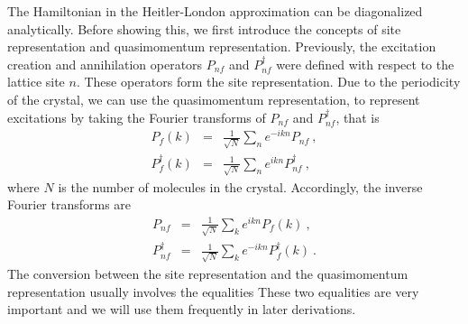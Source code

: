 The Hamiltonian in the Heitler-London approximation can be diagonalized analytically. Before showing this, we first introduce the concepts of site representation and quasimomentum representation. 
Previously,  the excitation creation and annihilation operators $P_{nf}$ and $P_{nf}^{\dagger}$ were defined with respect 
to the lattice site $n$. 
These operators form the site representation. Due to the periodicity of the crystal, we can use the quasimomentum representation, to represent excitations by taking the Fourier transforms of $P_{nf}$ and $P_{nf}^{\dagger}$, that is
\begin{eqnarray}
P_{f}(k)  &=& \frac{1}{\sqrt{N}} \sum_{n}  e^{-ikn}  P_{nf} \ , \nonumber \\
P_{f}^{\dagger}(k)  &=& \frac{1}{\sqrt{N}} \sum_{n}  e^{ikn} P_{nf}^{\dagger} \ , \label{eqn:KInTermsOfN}
\end{eqnarray}
where $N$ is the number of molecules in the crystal. Accordingly, the inverse Fourier transforms are
\begin{eqnarray}
P_{nf}   &=& \frac{1}{\sqrt{N}} \sum_{k}  e^{ikn} P_{f}(k)  \ , \nonumber \\
P_{nf}^{\dagger}   &=& \frac{1}{\sqrt{N}} \sum_{k}  e^{-ikn} P_{f}^{\dagger}(k) \ . \label{eqn:NInTermsOfK}
\end{eqnarray}
The conversion between the site representation and the quasimomentum representation usually involves the 
 equalities
These two equalities are very important and we will use them frequently in later derivations. 



